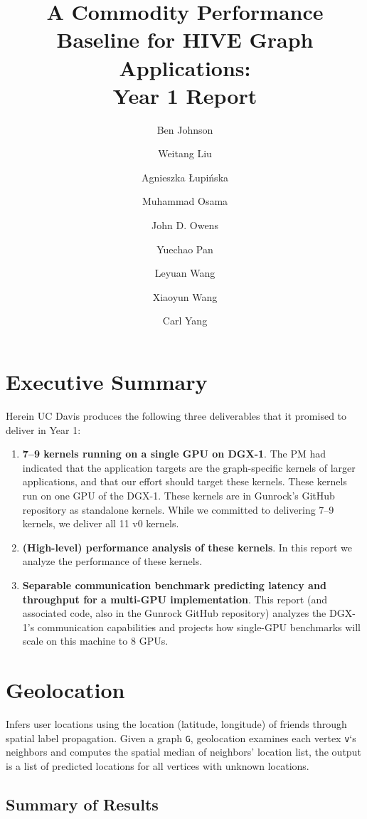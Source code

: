 \documentclass[10pt,article,oneside]{memoir}
\title{A Commodity Performance Baseline for HIVE Graph Applications:\\Year 1 Report}
\author{Ben Johnson \and Weitang Liu \and Agnieszka Łupińska \and Muhammad Osama \and John D. Owens \and Yuechao Pan \and Leyuan Wang \and Xiaoyun Wang \and Carl Yang}
\date{}
\begin{document}
\maketitle

{
\hypersetup{linkcolor=black}
\setcounter{tocdepth}{0}
\tableofcontents
}
\chapter{Executive Summary}\label{executive-summary}

Herein UC Davis produces the following three deliverables that it
promised to deliver in Year 1:

\begin{enumerate}
\def\labelenumi{\arabic{enumi}.}
\itemsep1pt\parskip0pt
\item
  \textbf{7--9 kernels running on a single GPU on DGX-1}. The PM had
  indicated that the application targets are the graph-specific kernels
  of larger applications, and that our effort should target these
  kernels. These kernels run on one GPU of the DGX-1. These kernels are
  in Gunrock's GitHub repository as standalone kernels. While we
  committed to delivering 7--9 kernels, we deliver all 11 v0 kernels.
\item
  \textbf{(High-level) performance analysis of these kernels}. In this
  report we analyze the performance of these kernels.
\item
  \textbf{Separable communication benchmark predicting latency and
  throughput for a multi-GPU implementation}. This report (and
  associated code, also in the Gunrock GitHub repository) analyzes the
  DGX-1's communication capabilities and projects how single-GPU
  benchmarks will scale on this machine to 8 GPUs.
\end{enumerate}

\chapter{Geolocation}\label{geolocation}

Infers user locations using the location (latitude, longitude) of
friends through spatial label propagation. Given a graph \texttt{G},
geolocation examines each vertex \texttt{v}`s neighbors and computes the
spatial median of neighbors' location list, the output is a list of
predicted locations for all vertices with unknown locations.

\section{Summary of Results}\label{summary-of-results}
\end{document}
